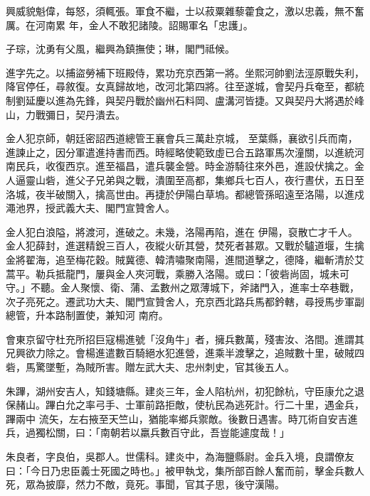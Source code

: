 \begin{pinyinscope}
 興威貌魁偉，每怒，須輒張。軍食不繼，士以菽粟雜藜藿食之，激以忠義，無不奮厲。在河南累
 年，金人不敢犯諸陵。詔賜軍名「忠護」。



 子琮，沈勇有父風，繼興為鎮撫使；琳，閣門祗候。



 進字先之。以捕盜勞補下班殿侍，累功充京西第一將。坐熙河帥劉法涇原戰失利，降官停任，尋敘復。女真歸故地，改河北第四將。往至遂城，會契丹兵奄至，都統制劉延慶以進為先鋒，與契丹戰於幽州石料岡、盧溝河皆捷。又與契丹大將遇於峰山，力戰彌日，契丹潰去。



 金人犯京師，朝廷密詔西道總管王襄會兵三萬赴京城，
 至葉縣，襄欲引兵而南，進諫止之，因分軍遣進持書而西。時經略使範致虛已合五路軍馬次潼關，以進統河南民兵，收復西京。進至福昌，遣兵襲金營。時金游騎往來外邑，進設伏擒之。金人逼靈山砦，進父子兄弟與之戰，潰圍至高都，集鄉兵七百人，夜行晝伏，五日至洛城，夜半破關入，擒高世由。再捷於伊陽白草塢。都總管孫昭遠至洛陽，以進戍澠池界，授武義大夫、閣門宣贊舍人。



 金人犯白浪隘，將渡河，進破之。未幾，洛陽再陷，進在
 伊陽，裒散亡才千人。金人犯薛封，進選精銳三百人，夜縱火斫其營，焚死者甚眾。又戰於驢道堰，生擒金將翟海，追至梅花穀。賊冀德、韓清嘯聚南陽，進間道擊之，德降，繼斬清於艾蒿平。勒兵抵龍門，屢與金人夾河戰，乘勝入洛陽。或曰：「彼砦尚固，城未可守。」不聽。金人聚懷、衛、蒲、孟數州之眾薄城下，斧諸門入，進率士卒巷戰，次子亮死之。遷武功大夫、閣門宣贊舍人，充京西北路兵馬都鈐轄，尋授馬步軍副總管，升本路制置使，兼知河
 南府。



 會東京留守杜充所招巨寇楊進號「沒角牛」者，擁兵數萬，殘害汝、洛間。進謂其兄興欲力除之。會楊進遣數百騎絕水犯進營，進乘半渡擊之，追賊數十里，破賊四砦，馬驚墜塹，為賊所害。贈左武大夫、忠州刺史，官其後五人。



 朱蹕，湖州安吉人，知錢塘縣。建炎三年，金人陷杭州，初犯餘杭，守臣康允之退保赭山。蹕白允之率弓手、士軍前路拒敵，使杭民為逃死計。行二十里，遇金兵，蹕兩中
 流矢，左右掖至天竺山，猶能率鄉兵禦敵。後數日遇害。時兀術自安吉進兵，過獨松關，曰：「南朝若以羸兵數百守此，吾豈能遽度哉！」



 朱良者，字良伯，吳郡人。世儒科。建炎中，為海鹽縣尉。金兵入境，良謂僚友曰：「今日乃忠臣義士死國之時也。」被甲執戈，集所部百餘人奮而前，擊金兵數人死，眾為披靡，然力不敵，竟死。事聞，官其子思，後守漢陽。




\end{pinyinscope}
